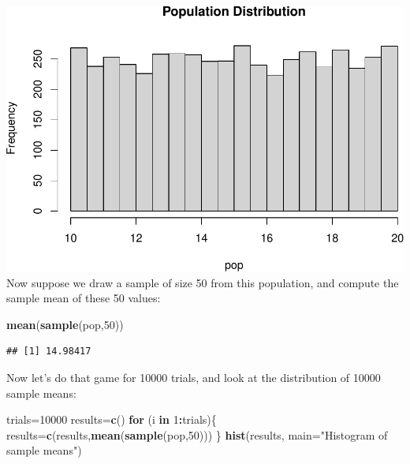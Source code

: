 \documentclass[
]{book}
\newenvironment{Shaded}{\begin{snugshade}}{\end{snugshade}}
\newcommand{\AttributeTok}[1]{\textcolor[rgb]{0.13,0.29,0.53}{#1}}
\newcommand{\ControlFlowTok}[1]{\textcolor[rgb]{0.13,0.29,0.53}{\textbf{#1}}}
\newcommand{\DecValTok}[1]{\textcolor[rgb]{0.00,0.00,0.81}{#1}}
\newcommand{\FunctionTok}[1]{\textcolor[rgb]{0.13,0.29,0.53}{\textbf{#1}}}
\newcommand{\NormalTok}[1]{#1}
\newcommand{\OtherTok}[1]{\textcolor[rgb]{0.56,0.35,0.01}{#1}}
\newcommand{\SpecialCharTok}[1]{\textcolor[rgb]{0.81,0.36,0.00}{\textbf{#1}}}
\newcommand{\StringTok}[1]{\textcolor[rgb]{0.31,0.60,0.02}{#1}}
\theoremstyle{definition}
\theoremstyle{definition}
\theoremstyle{definition}
\theoremstyle{definition}
\theoremstyle{remark}
\begin{document}
\includegraphics{math340-notes_files/figure-latex/unnamed-chunk-177-1.pdf}
Now suppose we draw a sample of size 50 from this population, and compute the sample mean of these 50 values:

\begin{Shaded}
\begin{Highlighting}[]
\FunctionTok{mean}\NormalTok{(}\FunctionTok{sample}\NormalTok{(pop,}\DecValTok{50}\NormalTok{))}
\end{Highlighting}
\end{Shaded}

\begin{verbatim}
## [1] 14.98417
\end{verbatim}

Now let's do that game for 10000 trials, and look at the distribution of 10000 sample means:

\begin{Shaded}
\begin{Highlighting}[]
\NormalTok{trials}\OtherTok{=}\DecValTok{10000}
\NormalTok{results}\OtherTok{=}\FunctionTok{c}\NormalTok{()}
\ControlFlowTok{for}\NormalTok{ (i }\ControlFlowTok{in} \DecValTok{1}\SpecialCharTok{:}\NormalTok{trials)\{}
\NormalTok{  results}\OtherTok{=}\FunctionTok{c}\NormalTok{(results,}\FunctionTok{mean}\NormalTok{(}\FunctionTok{sample}\NormalTok{(pop,}\DecValTok{50}\NormalTok{)))}
\NormalTok{\}}
\FunctionTok{hist}\NormalTok{(results, }\AttributeTok{main=}\StringTok{"Histogram of sample means"}\NormalTok{)}
\end{Highlighting}
\end{Shaded}
\end{document}
